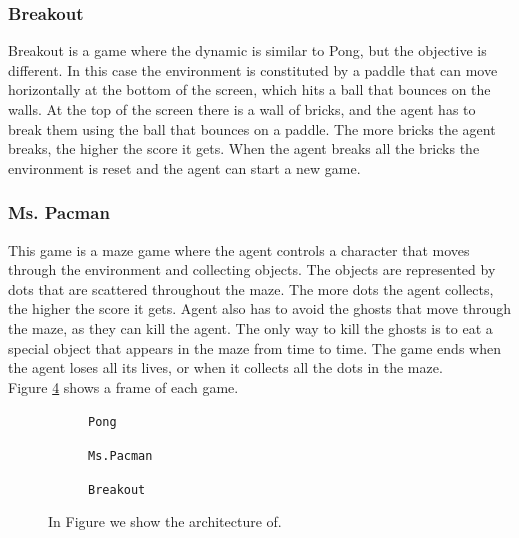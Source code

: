 \subsubsection{Breakout}
Breakout is a game where the dynamic is similar to Pong, but the objective is different.
In this case the environment is constituted by a paddle that can move horizontally at the bottom of the screen, which hits a ball that bounces on the walls.
At the top of the screen there is a wall of bricks, and the agent has to break them using the ball that bounces on a paddle.
The more bricks the agent breaks, the higher the score it gets.
When the agent breaks all the bricks the environment is reset and the agent can start a new game.


\subsubsection{Ms. Pacman}
This game is a maze game where the agent controls a character that moves through the environment and collecting objects.
The objects are represented by dots that are scattered throughout the maze.
The more dots the agent collects, the higher the score it gets.
Agent also has to avoid the ghosts that move through the maze, as they can kill the agent.
The only way to kill the ghosts is to eat a special object that appears in the maze from time to time.
The game ends when the agent loses all its lives, or when it collects all the dots in the maze. \\



Figure \ref{fig:environemnts} shows a frame of each game.
\begin{figure}[ht]
    \centering
    \begin{subfigure}[b]{0.30\textwidth}
        \centering
        \fbox{\rule[-.5cm]{0cm}{4cm} \rule[-.5cm]{4cm}{0cm}}
        \caption{\texttt{Pong}}
        \label{fig:pong_env}
    \end{subfigure}
    \hfill
    \begin{subfigure}[b]{0.30\textwidth}
        \centering
        \fbox{\rule[-.5cm]{0cm}{4cm} \rule[-.5cm]{4cm}{0cm}}
        \caption{\texttt{Ms.Pacman}}
        \label{fig:mspacman_env}
    \end{subfigure}
    \hfill
    \begin{subfigure}[b]{0.30\textwidth}
        \centering
        \fbox{\rule[-.5cm]{0cm}{4cm} \rule[-.5cm]{4cm}{0cm}}
        \caption{\texttt{Breakout}}
        \label{fig:breakout_env}
    \end{subfigure}
    \caption{In Figure we show the architecture of.}
    \label{fig:environemnts}
\end{figure}
